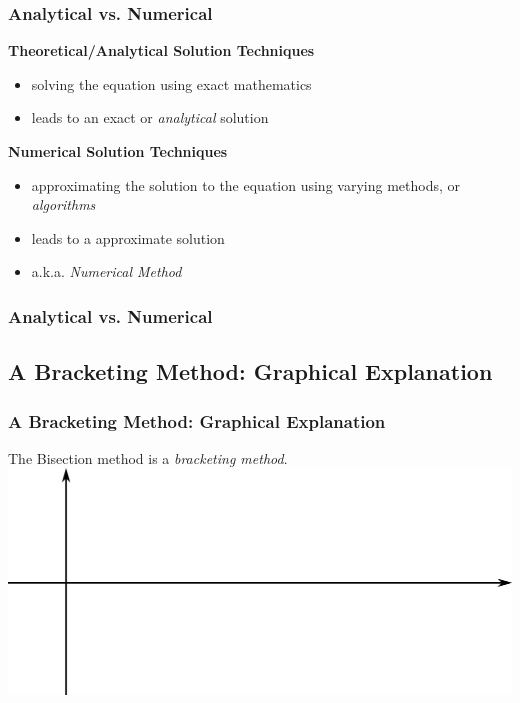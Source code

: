 \documentclass[fleqn]{beamer} %
\newcommand{\sectionIIIsubsectionItitle}{Analytical vs. Numerical}
\newcommand{\sectionIIIsubsectionIItitle}{A Bracketing Method: Graphical Explanation}
\begin{document}
			\begin{frame}
				\frametitle{\sectionIIIsubsectionItitle}
				\bigskip

				\vspace{5mm}  	
				\textbf{ Theoretical/Analytical Solution Techniques }
				\begin{itemize}
					\item solving the equation using exact mathematics \\
					\item leads to an exact or {\it analytical} solution \\ 	\vspace{10mm}
				\end{itemize}
				\textbf{ Numerical Solution Techniques }		
				\begin{itemize}
					\item  approximating the solution to the equation using varying methods, or {\it algorithms}  \\
					\item leads to a approximate solution \\ 
					\item a.k.a. {\it Numerical Method}\vspace{20mm}
				\end{itemize}
					
				\btVFill
			\end{frame}

			\begin{frame}
				\frametitle{\sectionIIIsubsectionItitle}
				\bigskip

				\btVFill
			\end{frame}

		\subsection{\sectionIIIsubsectionIItitle}\label{sectionIIIsubsectionII}	

			\begin{frame}
				\frametitle{\sectionIIIsubsectionIItitle}
				\bigskip

				The Bisection method is a {\it bracketing method}. \vspace{5mm}
				\includegraphics[scale=.40]{images/topic3_fig1.png}

				\btVFill
			\end{frame}
\end{document}
